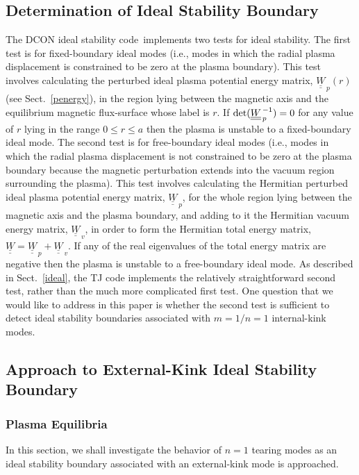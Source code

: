 \documentclass[12pt,prb,aps]{revtex4-1}
\begin{document}
\subsection{Determination of Ideal Stability Boundary}\label{determine}
The DCON ideal stability code\,\cite{dcon} implements two tests for ideal stability. The first test is for fixed-boundary ideal modes (i.e., modes in which the
radial plasma displacement is constrained to be zero at the plasma boundary). This test involves calculating the perturbed ideal plasma potential energy
matrix, $\underline{\underline{W}}_{\,p}(r)$  (see Sect.~\ref{penergy}), in the region lying between the magnetic axis and the equilibrium magnetic
flux-surface whose label is $r$. If ${\rm det}(\underline{\underline{W}}_{\,p}^{\,-1}) =0$
for any value of $r$ lying in the range $0\leq r\leq a$ then the plasma is unstable to a fixed-boundary ideal mode. The second test is for
free-boundary ideal modes (i.e., modes in which the radial plasma displacement is not constrained to be zero at the plasma boundary 
because the magnetic perturbation extends into the vacuum region surrounding the plasma). This test involves calculating the Hermitian perturbed ideal plasma potential energy
matrix, $\underline{\underline{W}}_{\,p}$,  for the whole  region lying  between the magnetic axis and the plasma boundary, and adding to it the Hermitian vacuum energy matrix,  $\underline{\underline{W}}_{\,v}$,  in order to
form the Hermitian  total energy matrix, $\underline{\underline{W}} =\underline{\underline{W}}_{\,p} +  \underline{\underline{W}}_{\,v}$. If any of the real eigenvalues
of the total energy matrix are negative then the plasma is unstable to a free-boundary ideal mode.  As described in Sect.~\ref{ideal}, the TJ code
implements the relatively straightforward second test, rather than the much more complicated first test. One question that we would like to address in
this paper is whether the second test is sufficient to detect ideal stability boundaries associated with $m=1/n=1$ internal-kink modes. 

\subsection{Approach to External-Kink Ideal Stability Boundary} \label{external}
\subsubsection{Plasma Equilibria}
In this section, we shall investigate the behavior of $n=1$ tearing modes as an ideal stability boundary associated with an  external-kink mode is approached. 
\end{document}
